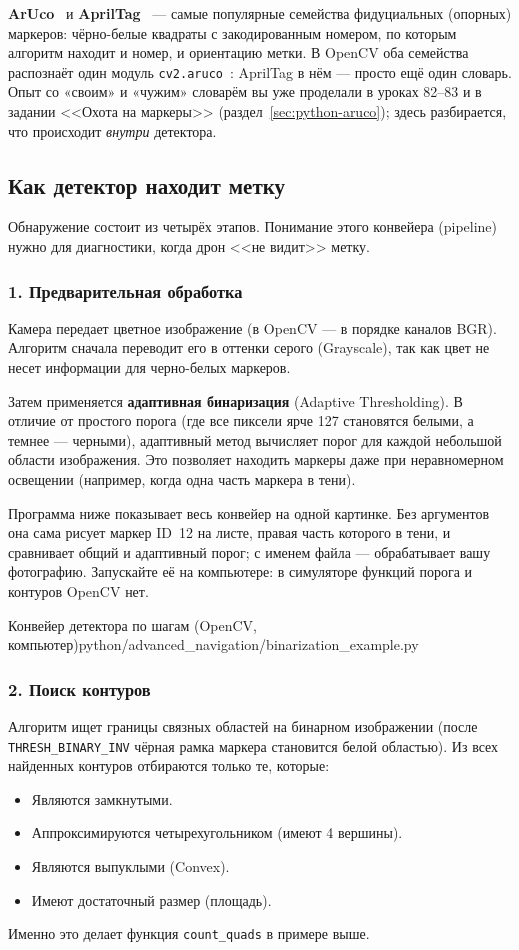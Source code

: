 \textbf{ArUco}~\cite{garrido2014aruco} и \textbf{AprilTag}~\cite{olson2011apriltag} --- самые популярные семейства фидуциальных (опорных) маркеров: чёрно-белые квадраты с закодированным номером, по которым алгоритм находит и номер, и ориентацию метки. В OpenCV оба семейства распознаёт один модуль \verb|cv2.aruco|~\cite{opencv_aruco}: AprilTag в нём --- просто ещё один словарь. Опыт со «своим» и «чужим» словарём вы уже проделали в уроках 82--83 и в задании <<Охота на маркеры>> (раздел~\ref{sec:python-aruco}); здесь разбирается, что происходит \emph{внутри} детектора.

\subsection{Как детектор находит метку}
Обнаружение состоит из четырёх этапов. Понимание этого конвейера (pipeline) нужно для диагностики, когда дрон <<не видит>> метку.

\subsubsection*{1. Предварительная обработка}
Камера передает цветное изображение (в OpenCV — в порядке каналов BGR). Алгоритм сначала переводит его в оттенки серого (Grayscale), так как цвет не несет информации для черно-белых маркеров.

Затем применяется \textbf{адаптивная бинаризация} (Adaptive Thresholding). В отличие от простого порога (где все пиксели ярче 127 становятся белыми, а темнее — черными), адаптивный метод вычисляет порог для каждой небольшой области изображения. Это позволяет находить маркеры даже при неравномерном освещении (например, когда одна часть маркера в тени).

Программа ниже показывает весь конвейер на одной картинке. Без аргументов она сама рисует маркер ID~12 на листе, правая часть которого в тени, и сравнивает общий и адаптивный порог; с именем файла --- обрабатывает вашу фотографию. Запускайте её на компьютере: в симуляторе функций порога и контуров OpenCV нет.

\begin{codefiletitle}[python]{Конвейер детектора по шагам (OpenCV, компьютер)}{python/advanced_navigation/binarization_example.py}
\end{codefiletitle}

\subsubsection*{2. Поиск контуров}
Алгоритм ищет границы связных областей на бинарном изображении (после \verb|THRESH_BINARY_INV| чёрная рамка маркера становится белой областью). Из всех найденных контуров отбираются только те, которые:
\begin{itemize}
    \item Являются замкнутыми.
    \item Аппроксимируются четырехугольником (имеют 4 вершины).
    \item Являются выпуклыми (Convex).
    \item Имеют достаточный размер (площадь).
\end{itemize}
Именно это делает функция \verb|count_quads| в примере выше.

